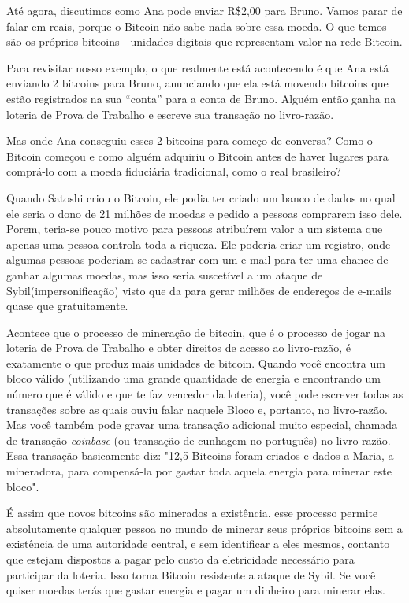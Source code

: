 Até agora, discutimos como Ana pode enviar R\$2,00 para Bruno. Vamos parar de falar em reais, porque o Bitcoin não sabe nada sobre essa moeda. O que temos são os próprios bitcoins - unidades digitais que representam valor na rede Bitcoin.

Para revisitar nosso exemplo, o que realmente está acontecendo é que Ana está enviando 2 bitcoins para Bruno, anunciando que ela está movendo bitcoins que estão registrados na sua “conta” para a conta de Bruno. Alguém então ganha na loteria de Prova de Trabalho e escreve sua transação no livro-razão.

Mas onde Ana conseguiu esses 2 bitcoins para começo de conversa? Como o Bitcoin começou e como alguém adquiriu o Bitcoin antes de haver lugares para comprá-lo com a moeda fiduciária tradicional, como o real brasileiro?

Quando Satoshi criou o Bitcoin, ele podia ter criado um banco de dados no qual ele seria o dono de 21 milhões de moedas e pedido a pessoas comprarem isso dele. Porem, teria-se pouco motivo para pessoas atribuírem valor a um sistema que apenas uma pessoa controla toda a riqueza. Ele poderia criar um registro, onde algumas pessoas poderiam se cadastrar com um e-mail para ter uma chance de ganhar algumas moedas, mas isso seria suscetível a um ataque de Sybil(impersonificação) visto que da para gerar milhões de endereços de e-mails quase que gratuitamente.

Acontece que o processo de mineração de bitcoin, que é o processo de jogar na loteria de Prova de Trabalho e obter direitos de acesso ao livro-razão, é exatamente o que produz mais unidades de bitcoin. Quando você encontra um bloco válido (utilizando uma grande quantidade de energia e encontrando um número que é válido e que te faz vencedor da loteria), você pode escrever todas as transações sobre as quais ouviu falar naquele Bloco e, portanto, no livro-razão.%
Mas você também pode gravar uma transação adicional muito especial, chamada de transação \textit{coinbase} (ou transação de cunhagem no português) no livro-razão. Essa transação basicamente diz: "12,5 Bitcoins foram criados e dados a Maria, a mineradora, para compensá-la por gastar toda aquela energia para minerar este bloco".

É assim que novos bitcoins são minerados a existência. esse processo permite absolutamente qualquer pessoa no mundo de minerar seus próprios bitcoins sem a existência de uma autoridade central, e sem identificar a eles mesmos, contanto que estejam dispostos a pagar pelo custo da eletricidade necessário para participar da loteria. Isso torna Bitcoin resistente a ataque de Sybil. Se você quiser moedas terás que gastar energia e pagar um dinheiro para minerar elas.

